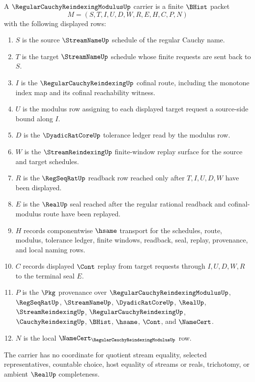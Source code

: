 \begin{definition}
\label{def:regular-cauchy-reindexing-modulus-carrier}
A $\RegularCauchyReindexingModulusUp$ carrier is a finite $\BHist$ packet
$$
M=(S,T,I,U,D,W,R,E,H,C,P,N)
$$
with the following displayed rows:
\begin{enumerate}
\item $S$ is the source $\StreamNameUp$ schedule of the regular Cauchy name.
\item $T$ is the target $\StreamNameUp$ schedule whose finite requests are sent back to $S$.
\item $I$ is the $\RegularCauchyReindexingUp$ cofinal route, including the monotone index map and its cofinal reachability witness.
\item $U$ is the modulus row assigning to each displayed target request a source-side bound along $I$.
\item $D$ is the $\DyadicRatCoreUp$ tolerance ledger read by the modulus row.
\item $W$ is the $\StreamReindexingUp$ finite-window replay surface for the source and target schedules.
\item $R$ is the $\RegSeqRatUp$ readback row reached only after $T,I,U,D,W$ have been displayed.
\item $E$ is the $\RealUp$ seal reached after the regular rational readback and cofinal-modulus route have been replayed.
\item $H$ records componentwise $\hsame$ transport for the schedules, route, modulus, tolerance ledger, finite windows, readback, seal, replay, provenance, and local naming rows.
\item $C$ records displayed $\Cont$ replay from target requests through $I,U,D,W,R$ to the terminal seal $E$.
\item $P$ is the $\Pkg$ provenance over $\RegularCauchyReindexingModulusUp$, $\RegSeqRatUp$, $\StreamNameUp$, $\DyadicRatCoreUp$, $\RealUp$, $\StreamReindexingUp$, $\RegularCauchyReindexingUp$, $\CauchyReindexingUp$, $\BHist$, $\hsame$, $\Cont$, and $\NameCert$.
\item $N$ is the local $\NameCert_{\RegularCauchyReindexingModulusUp}$ row.
\end{enumerate}
The carrier has no coordinate for quotient stream equality, selected representatives, countable choice, host equality of streams or reals, trichotomy, or ambient $\RealUp$ completeness.
\end{definition}

